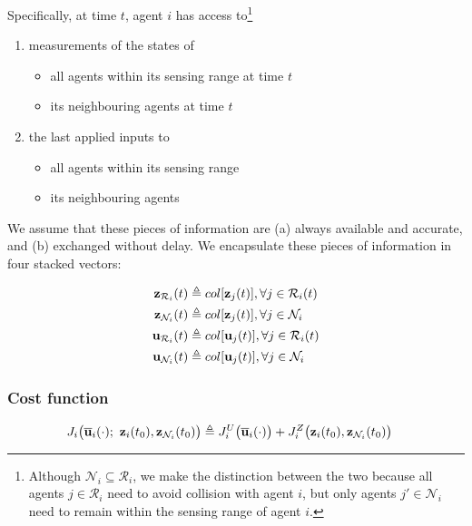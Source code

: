 Specifically, at time $t$, agent $i$ has access to\footnote{Although
    $\mathcal{N}_i \subseteq \mathcal{R}_i$, we make the distinction between
    the two because all agents $j \in \mathcal{R}_i$ need to avoid collision
    with agent $i$, but only agents $j' \in \mathcal{N}_i$ need to remain
    within the sensing range of agent $i$.}

\begin{enumerate}
  \item measurements of the states of
    \begin{itemize}
      \item all agents within its sensing range at time $t$
      \item its neighbouring agents at time $t$
      \end{itemize}
    \item the last applied inputs to
      \begin{itemize}
        \item all agents within its sensing range
        \item its neighbouring agents
      \end{itemize}
\end{enumerate}

We assume that these pieces of information are (a) always available and
accurate, and (b) exchanged without delay. We encapsulate these pieces of
information in four stacked vectors:

\begin{align}
  \bm{\mathbf{z}}_{\mathcal{R}_i}(t) &\triangleq col[\bm{\mathbf{z}}_j(t)], \forall j \in \mathcal{R}_i(t) \\
  \bm{\mathbf{z}}_{\mathcal{N}_i}(t) &\triangleq col[\bm{\mathbf{z}}_j(t)], \forall j \in \mathcal{N}_i \\
  \bm{\mathbf{u}}_{\mathcal{R}_i}(t) &\triangleq col[\bm{\mathbf{u}}_j(t)], \forall j \in \mathcal{R}_i(t) \\
  \bm{\mathbf{u}}_{\mathcal{N}_i}(t) &\triangleq col[\bm{\mathbf{u}}_j(t)], \forall j \in \mathcal{N}_i
\end{align}


\subsubsection{Cost function}

\begin{align}
  J_i \big(\overline{\bm{\mathbf{u}}}_i (\cdot);\ \bm{\mathbf{z}}_i(t_0), \bm{\mathbf{z}}_{\mathcal{N}_i}(t_0)\big) &\triangleq
    J_i^U \big(\overline{\bm{\mathbf{u}}}_i (\cdot) \big) +
    J_i^Z \big(\bm{\mathbf{z}}_i (t_0), \bm{\mathbf{z}}_{\mathcal{N}_i}(t_0)\big)
\end{align}

